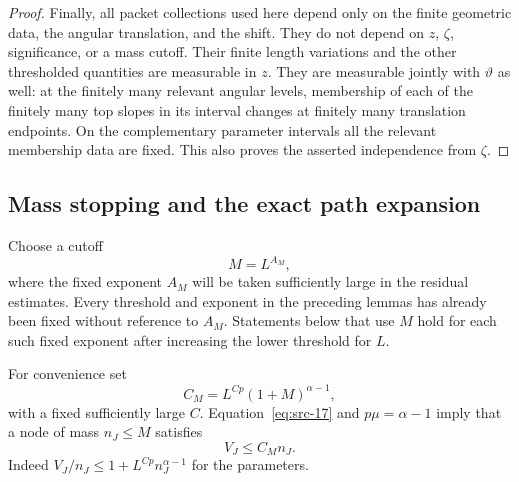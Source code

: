 \begin{proof}
Finally, all packet collections used here depend only on the finite
geometric data, the angular translation, and the shift.  They do not
depend on $z$, $\zeta$, significance, or a mass cutoff.  Their finite
length variations and the other thresholded quantities are measurable
in $z$.  They are measurable jointly with $\vartheta$ as well: at the
finitely many relevant angular levels, membership of each of the
finitely many top slopes in its interval changes at finitely many
translation endpoints.  On the complementary parameter intervals
all the relevant membership data are fixed.  This also proves the
asserted independence from $\zeta$.
\end{proof}

\subsection{Mass stopping and the exact path expansion}

Choose a cutoff
\begin{equation}
 M=L^{A_M},
 \label{hier:mass-cutoff}
\end{equation}
where the fixed exponent $A_M$ will be taken sufficiently large in the
residual estimates.  Every threshold and exponent in the preceding
lemmas has already been fixed without reference to $A_M$.  Statements
below that use $M$ hold for each such fixed exponent after increasing
the lower threshold for $L$.

For convenience set
\begin{equation}
 C_M=L^{Cp}(1+M)^{\alpha-1},
 \label{hier:stop-cost}
\end{equation}
with a fixed sufficiently large $C$.  Equation~\eqref{eq:src-17} and
$p\mu=\alpha-1$ imply that a node of mass $n_J\le M$ satisfies
\begin{equation}
 V_J\le C_M n_J.
 \label{hier:small-node-amount}
\end{equation}
Indeed $V_J/n_J\le1+L^{Cp}n_J^{\alpha-1}$ for the parameters.

